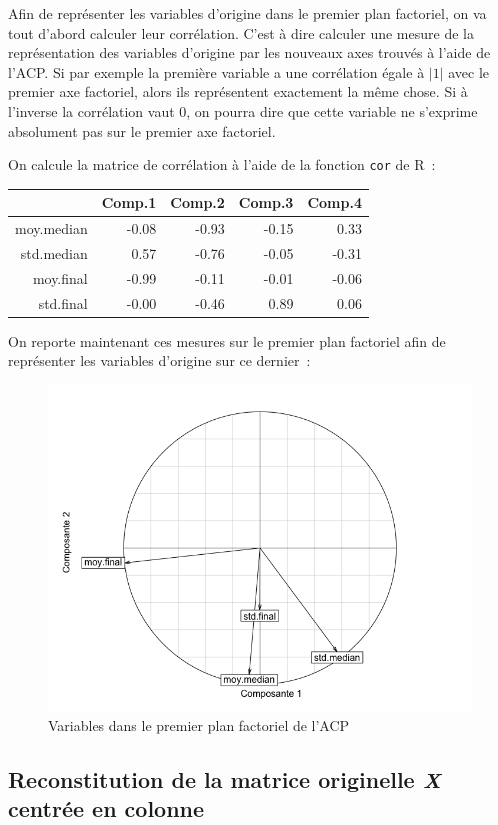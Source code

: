 \documentclass[a4paper,10pt]{report}
\begin{document}
Afin de représenter les variables d'origine dans le premier plan factoriel, on va tout d'abord calculer leur corrélation. C'est à dire calculer une mesure de la représentation des variables d'origine par les nouveaux axes trouvés à l'aide de l'ACP. Si par exemple la première variable a une corrélation égale à $|1|$ avec le premier axe factoriel, alors ils représentent exactement la même chose. Si à l'inverse la corrélation vaut $0$, on pourra dire que cette variable ne s'exprime absolument pas sur le premier axe factoriel.

On calcule la matrice de corrélation à l'aide de la fonction \texttt{cor} de R~:
\begin{table}[H]
	\centering
	\begin{tabular}{r|rrrr}
		& Comp.1 & Comp.2 & Comp.3 & Comp.4 \\ 
		\hline
		moy.median & -0.08 & -0.93 & -0.15 & 0.33 \\ 
		std.median & 0.57 & -0.76 & -0.05 & -0.31 \\ 
		moy.final & -0.99 & -0.11 & -0.01 & -0.06 \\ 
		std.final & -0.00 & -0.46 & 0.89 & 0.06 \\ 
	\end{tabular}
\end{table}

On reporte maintenant ces mesures sur le premier plan factoriel afin de représenter les variables d'origine sur ce dernier~:
\begin{figure}[H]
	\centering
	\captionsetup{justification=centering, margin=2cm}
	\includegraphics[width=.5\linewidth]{img/2-1-2-variables-premier-plan-factoriel}
	\caption{\scriptsize Variables dans le premier plan factoriel de l'ACP}
	\label{fig:variables_premier_plan_factoriel}
\end{figure}



\subsection{Reconstitution de la matrice originelle \textit{X} centrée en colonne}
\end{document}
